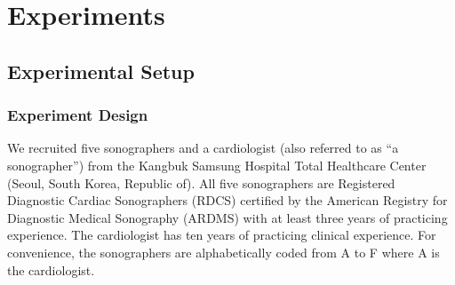 

%

\section{Experiments}\label{section:eval}

\subsection{Experimental Setup}
\subsubsection{Experiment Design}\label{section:experiment_design}
We recruited five sonographers and a cardiologist (also referred to as ``a sonographer'') from the Kangbuk Samsung Hospital Total Healthcare Center (Seoul, South Korea, Republic of).
All five sonographers are Registered Diagnostic Cardiac Sonographers (RDCS) certified by the American Registry for Diagnostic Medical Sonography (ARDMS) with at least three years of practicing experience.
The cardiologist has ten years of practicing clinical experience.
For convenience, the sonographers are alphabetically coded from A to F where A is the cardiologist.

